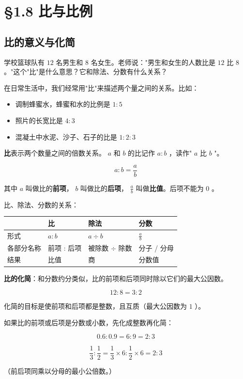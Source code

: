 \chapter{§1.8 比与比例}
\label{sec:1.8}





\section*{比的意义与化简}


\begin{explore}


学校篮球队有 $12$ 名男生和 $8$ 名女生。老师说："男生和女生的人数比是 $12$ 比 $8$ 。"这个"比"是什么意思？它和除法、分数有什么关系？

在日常生活中，我们经常用"比"来描述两个量之间的关系。比如：

\begin{itemize}
  \item 调制蜂蜜水，蜂蜜和水的比例是 $1 : 5$
  \item 照片的长宽比是 $4 : 3$
  \item 混凝土中水泥、沙子、石子的比是 $1 : 2 : 3$
\end{itemize}


\end{explore}

\begin{understand}


\textbf{比}表示两个数量之间的倍数关系。 $a$ 和 $b$ 的比记作 $a : b$ ，读作" $a$ 比 $b$ "。

\[
a : b = \frac{a}{b}
\]


其中 $a$ 叫做比的\textbf{前项}， $b$ 叫做比的\textbf{后项}， $\frac{a}{b}$ 叫做\textbf{比值}。后项不能为 $0$ 。

比、除法、分数的关系：

\begin{center}
\begin{tabular}{llll}
\toprule
 & 比 & 除法 & 分数 \\
\midrule
形式 & $a : b$ & $a \div b$ & $\frac{a}{b}$ \\
各部分名称 & 前项 : 后项 & 被除数 $\div$ 除数 & 分子 / 分母 \\
结果 & 比值 & 商 & 分数值 \\
\bottomrule
\end{tabular}
\end{center}


\textbf{比的化简}：和分数约分类似，比的前项和后项同时除以它们的最大公因数。

\[
12 : 8 = 3 : 2
\]


化简的目标是使前项和后项都是整数，且互质（最大公因数为 $1$ ）。

如果比的前项或后项是分数或小数，先化成整数再化简：

\[
0.6 : 0.9 = 6 : 9 = 2 : 3
\]


\[
\frac{1}{3} : \frac{1}{2} = \frac{1}{3} \times 6 : \frac{1}{2} \times 6 = 2 : 3
\]


（前后项同乘以分母的最小公倍数。）

\end{understand}

